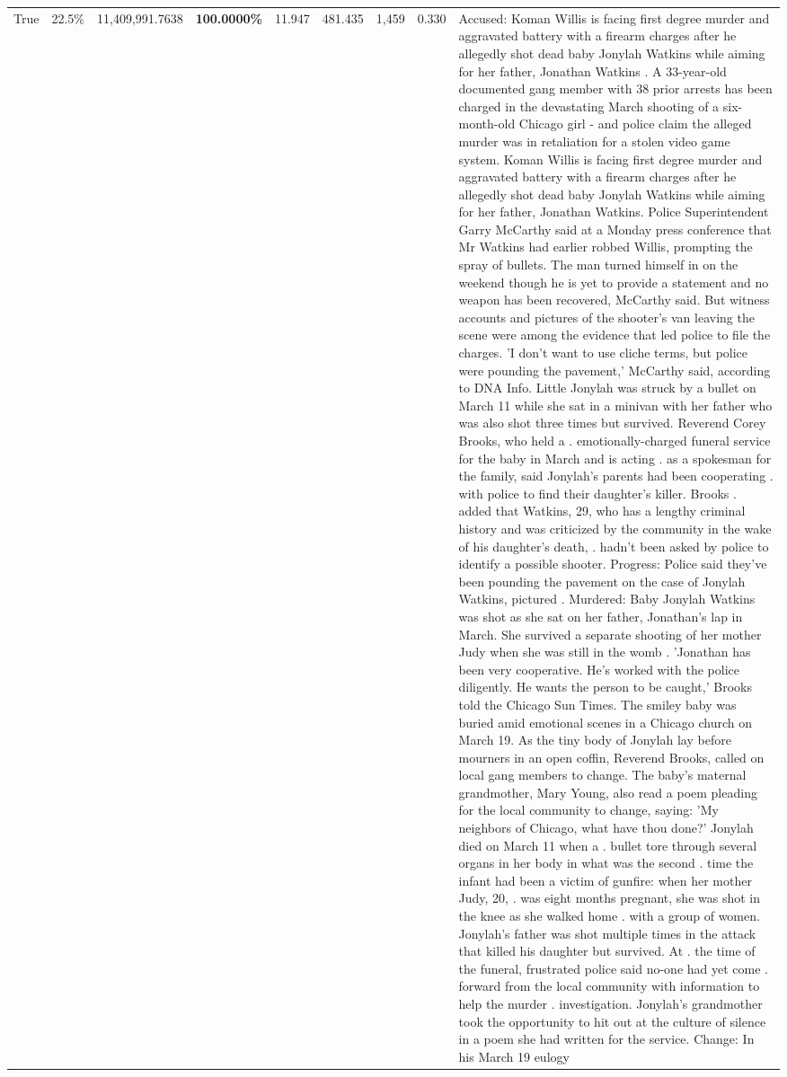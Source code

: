 \begin{table}[H]
\begin{tabular}{lllrlllll}
True & 22.5\% & 11,409,991.7638 & \bfseries \color{red} 100.0000\% & 11.947 & 481.435 & 1,459 & 0.330 & Accused: Koman Willis is facing first degree murder and aggravated battery with a firearm charges after he allegedly shot dead baby Jonylah Watkins while aiming for her father, Jonathan Watkins . A 33-year-old documented gang member with 38 prior arrests has been charged in the devastating March shooting of a six-month-old Chicago girl - and police claim the alleged murder was in retaliation for a stolen video game system. Koman Willis is facing first degree murder and aggravated battery with a firearm charges after he allegedly shot dead baby Jonylah Watkins while aiming for her father, Jonathan Watkins. Police Superintendent Garry McCarthy said at a Monday press conference that Mr Watkins had earlier robbed Willis, prompting the spray of bullets. The man turned himself in on the weekend though he is yet to provide a statement and no weapon has been recovered, McCarthy said. But witness accounts and pictures of the shooter's van leaving the scene were among the evidence that led police to file the charges. 'I don't want to use cliche terms, but police were pounding the pavement,' McCarthy said, according to DNA Info. Little Jonylah was struck by a bullet on March 11 while she sat in a minivan with her father who was also shot three times but survived. Reverend Corey Brooks, who held a . emotionally-charged funeral service for the baby in March and is acting . as a spokesman for the family, said Jonylah's parents had been cooperating . with police to find their daughter's killer. Brooks . added that Watkins, 29, who has a lengthy criminal history and was criticized by the community in the wake of his daughter's death, . hadn't been asked by police to identify a possible shooter. Progress: Police said they've been pounding the pavement on the case of Jonylah Watkins, pictured . Murdered: Baby Jonylah Watkins was shot as she sat on her father, Jonathan's lap in March. She survived a separate shooting of her mother Judy when she was still in the womb . 'Jonathan has been very cooperative. He's worked with the police diligently. He wants the person to be caught,' Brooks told the Chicago Sun Times. The smiley baby was buried amid emotional scenes in a Chicago church on March 19. As the tiny body of Jonylah lay before mourners in an open coffin, Reverend Brooks, called on local gang members to change. The baby's maternal grandmother, Mary Young, also read a poem pleading for the local community to change, saying: 'My neighbors of Chicago, what have thou done?' Jonylah died on March 11 when a . bullet tore through several organs in her body in what was the second . time the infant had been a victim of gunfire: when her mother Judy, 20, . was eight months pregnant, she was shot in the knee as she walked home . with a group of women. Jonylah's father was shot multiple times in the attack that killed his daughter but survived. At . the time of the funeral, frustrated police said no-one had yet come . forward from the local community with information to help the murder . investigation. Jonylah's grandmother took the opportunity to hit out at the culture of silence in a poem she had written for the service. Change: In his March 19 eulogy 
\end{tabular}
\end{table}
